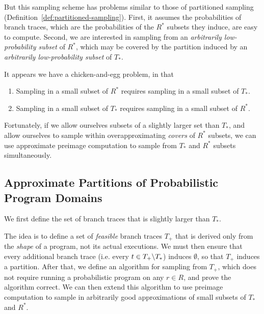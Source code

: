 But this sampling scheme has problems similar to those of partitioned sampling (Definition~\ref{def:partitioned-sampling}).
First, it assumes the probabilities of branch traces, which are the probabilities of the $R^*$ subsets they induce, are easy to compute.
Second, we are interested in sampling from an \emph{arbitrarily low-probability subset} of $R^*$, which may be covered by the partition induced by an \emph{arbitrarily low-probability subset} of $T_*$.

It appears we have a chicken-and-egg problem, in that
\begin{enumerate}
	\item Sampling in a small subset of $R^*$ requires sampling in a small subset of $T_*$.
	\item Sampling in a small subset of $T_*$ requires sampling in a small subset of $R^*$.
\end{enumerate}
Fortunately, if we allow ourselves subsets of a slightly larger set than $T_*$, and allow ourselves to sample within overapproximating \emph{covers} of $R^*$ subsets, we can use approximate preimage computation to sample from $T_*$ and $R^*$ subsets simultaneously.

\subsection{Approximate Partitions of Probabilistic Program Domains}

We first define the set of branch traces that is slightly larger than $T_*$.

The idea is to define a set of \emph{feasible} branch traces $T_+$ that is derived only from the \emph{shape} of a program, not its actual executions.
We must then ensure that every additional branch trace (i.e. every $t \in T_+ \backslash T_*$) induces $\emptyset$, so that $T_+$ induces a partition.
After that, we define an algorithm for sampling from $T_+$, which does not require running a probabilistic program on any $r \in R$, and prove the algorithm correct.
We can then extend this algorithm to use preimage computation to sample in arbitrarily good approximations of small subsets of $T_*$ and $R^*$.


